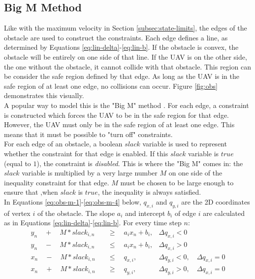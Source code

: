 \subsection{Big M Method}
Like with the maximum velocity in Section \ref{subsec:state-limits}, the edges of the obstacle are used to construct the constraints. Each edge defines a line, as determined by Equations \ref{eq:lin-delta}-\ref{eq:lin-b}. If the obstacle is convex, the obstacle will be entirely on one side of that line. If the UAV is on the other side, the one without the obstacle, it cannot collide with that obstacle. This region can be consider the safe region defined by that edge. As long as the UAV is in the safe region of at least one edge, no collisions can occur. Figure \ref{fig:obs} demonstrates this visually. \\
A popular way to model this is the "Big M" method \cite{Schouwenaars2001}. For each edge, a constraint is constructed which forces the UAV to be in the safe region for that edge. However, the UAV must only be in the safe region of at least one edge. This means that it must be possible to "turn off" constraints. \\
For each edge of an obstacle, a boolean $slack$ variable is used to represent whether the constraint for that edge is enabled. If this $slack$ variable is $true$ (equal to $1$), the constraint is \emph{disabled}. This is where the "Big M" comes in: the $slack$ variable is multiplied by a very large number $M$ on one side of the inequality constraint for that edge. $M$ must be chosen to be large enough to ensure that ,when $slack$ is $true$, the inequality is always satisfied. \\
In Equations \ref{eq:obs-m-1}-\ref{eq:obs-m-4} below, $q_{x,i}$ and $q_{y,i}$ are the 2D coordinates of vertex $i$ of the obstacle. The slope $a_{i}$ and intercept $b_{i}$ of edge $i$ are calculated as in Equations \ref{eq:lin-delta}-\ref{eq:lin-b}. For every time step $n$:
\\
\begin{align}
y_{n} \quad + \quad M*slack_{i,n} \quad &\geq 
\quad a_{i} x_{n} + b_{i},  	
& \Delta q_{x,i} < 0 							 	
\label{eq:obs-m-1} \\
y_{n} \quad - \quad M*slack_{i,n} \quad &\leq 
\quad a_{i} x_{n} + b_{i},
& \Delta q_{x,i} > 0 							 	
\label{eq:obs-m-2} \\
x_{n} \quad - \quad M*slack_{i,n} \quad &\leq
\quad  q_{x,i}, 		
& \Delta q_{y,i} < 0, \quad \Delta q_{x,i} = 0 	
\label{eq:obs-m-3} \\
x_{n} \quad + \quad M*slack_{i,n} \quad &\geq 
\quad q_{y,i},  		
& \Delta q_{y,i} > 0, \quad \Delta q_{x,i} = 0 	
\label{eq:obs-m-4}
\end{align}
